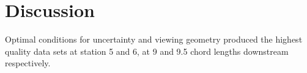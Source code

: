 
\section{Discussion}

Optimal conditions for uncertainty and viewing geometry produced the highest 
quality data sets at station 5 and 6, at 9 and 9.5 chord lengths downstream 
respectively. 






